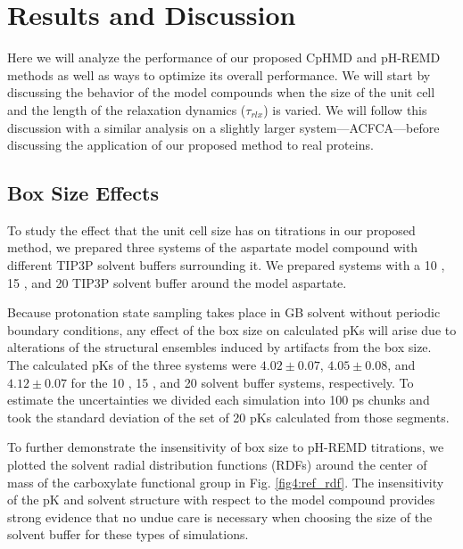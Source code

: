 \section{Results and Discussion}

Here we will analyze the performance of our proposed CpHMD and pH-REMD methods
as well as ways to optimize its overall performance. We will start by discussing
the behavior of the model compounds when the size of the unit cell and the
length of the relaxation dynamics ($\tau _ {rlx}$) is varied.  We will follow
this discussion with a similar analysis on a slightly larger
system---ACFCA---before discussing the application of our proposed method to
real proteins.

\subsection{Box Size Effects}

To study the effect that the unit cell size has on titrations in our proposed
method, we prepared three systems of the aspartate model compound with different
TIP3P solvent buffers surrounding it. We prepared systems with a 10 \text{\AA},
15 \text{\AA}, and 20 \text{\AA} TIP3P solvent buffer around the model
aspartate.

Because protonation state sampling takes place in GB solvent without periodic
boundary conditions, any effect of the box size on calculated pKs will
arise due to alterations of the structural ensembles induced by artifacts from
the box size. The calculated pKs of the three systems were $4.02 \pm
0.07$, $4.05 \pm 0.08$, and $4.12 \pm 0.07$ for the 10 \text{\AA}, 15
\text{\AA}, and 20 \text{\AA} solvent buffer systems, respectively. To estimate
the uncertainties we divided each simulation into 100 ps chunks and took the
standard deviation of the set of 20 pKs calculated from those segments.

To further demonstrate the insensitivity of box size to pH-REMD titrations, we
plotted the solvent radial distribution functions (RDFs) around the center of
mass of the carboxylate functional group in Fig. \ref{fig4:ref_rdf}. The
insensitivity of the pK and solvent structure with respect to the model
compound provides strong evidence that no undue care is necessary when choosing
the size of the solvent buffer for these types of simulations.

